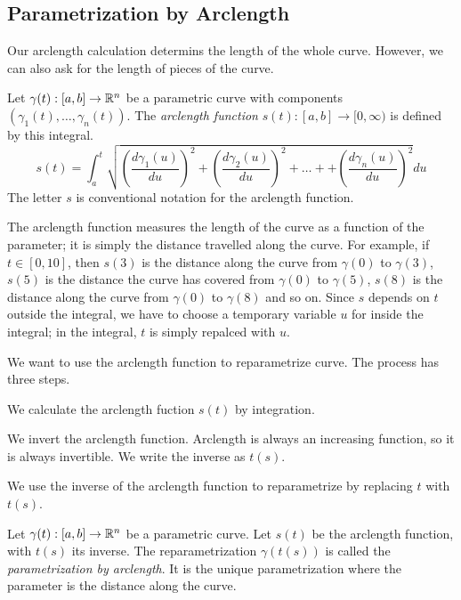 \documentclass[fleqn,letterpaper]{report}
\begin{document}
\subsection{Parametrization by Arclength}
\label{parametrization-by-arclength}

Our arclength 
calculation determins the length of the whole curve. However,
we can also ask for the length of pieces of the curve.

\begin{defn}
Let $\gamma(t): [a,b] \rightarrow \mathbb{R}^n$ be a parametric curve
with components $(\gamma_1(t), \ldots, \gamma_n(t))$.  The
\emph{arclength function} $s(t): [a,b] \rightarrow [0,
\infty)$ is defined by this integral.
\begin{equation*}
s(t) = \int_a^t \sqrt{ \left( \frac{d\gamma_1(u)}{du} \right)^2 
+ \left( \frac{d\gamma_2(u)}{du} \right)^2 + \ldots + 
+ \left( \frac{d\gamma_n(u)}{du} \right)^2 } du 
\end{equation*}
The letter $s$ is conventional notation for the arclength
function. 
\end{defn}

The arclength function measures the length of the curve as a
function of the parameter; it is simply the distance travelled
along the curve. For example, if $t \in [0,10]$, then $s(3)$
is the distance along the  curve from $\gamma(0)$
to $\gamma(3)$, $s(5)$ is the distance the curve has covered
from $\gamma(0)$ to $\gamma(5)$, $s(8)$ is the distance along
the curve from $\gamma(0)$ to $\gamma(8)$ and so on.  Since
$s$ depends on $t$ outside the integral, we have to choose a
temporary variable $u$ for inside the integral; in the
integral, $t$ is simply repalced with $u$.

We want to use the arclength function to reparametrize curve.
The process has three steps.
\begin{smallparts}
\item We calculate the arclength fuction $s(t)$ by
integration.
\item We invert the arclength function. Arclength is always an
increasing function, so it is always invertible. We write the
inverse as $t(s)$. 
\item We use the inverse of the arclength function to
reparametrize by replacing $t$ with $t(s)$. 
\end{smallparts}

\begin{defn}
Let $\gamma(t) : [a,b] \rightarrow \mathbb{R}^n$ be a parametric
curve. Let $s(t)$ be the arclength function, with $t(s)$ its
inverse. The reparametrization $\gamma(t(s))$ is called the
\emph{parametrization by arclength}. It is the unique
parametrization where the parameter is the distance along the
curve. 
\end{defn}
\end{document}
